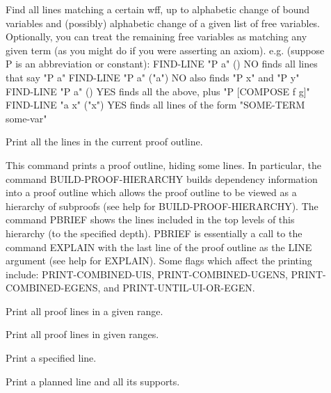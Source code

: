 \begin{description}
\item[\parbox{\textwidth}{FIND-LINE \textit{wff} \textit{vars} \textit{meta}}]  
Find all lines matching a certain wff, up to
alphabetic change of bound variables and (possibly) 
alphabetic change of a given list of free variables.
Optionally, you can treat the remaining free variables
as matching any given term (as you might do if you were
asserting an axiom).
e.g. (suppose P is an abbreviation or constant):
FIND-LINE "P a" () NO       finds all lines that say "P a"
FIND-LINE "P a" ("a") NO    also finds "P x" and "P y"
FIND-LINE "P a" () YES      finds all the above, plus 
                              "P [COMPOSE f g]"
FIND-LINE "a x" ("x") YES   finds all lines of the form
                              "SOME-TERM some-var"

\item[\parbox{\textwidth}{PALL}]  
	Print all the lines in the current proof outline.

\item[\parbox{\textwidth}{PBRIEF \textit{depth}}]  
This command prints a proof outline, hiding some lines.
In particular, the command BUILD-PROOF-HIERARCHY builds
dependency information into a proof outline which allows
the proof outline to be viewed as a hierarchy of subproofs (see
help for BUILD-PROOF-HIERARCHY).  The command PBRIEF shows
the lines included in the top levels of this hierarchy (to the 
specified depth). PBRIEF is essentially a call to the command EXPLAIN
with the last line of the proof outline as the LINE argument (see help 
for EXPLAIN).  Some flags which affect the printing include:
PRINT-COMBINED-UIS, PRINT-COMBINED-UGENS, PRINT-COMBINED-EGENS,
and PRINT-UNTIL-UI-OR-EGEN.

\item[\parbox{\textwidth}{PL \textit{num1} \textit{num2}}]  
	Print all proof lines in a given range.

\item[\parbox{\textwidth}{PL* \textit{print-ranges}}]  
Print all proof lines in given ranges.

\item[\parbox{\textwidth}{PLINE \textit{line}}]  
	Print a specified line.

\item[\parbox{\textwidth}{PPLAN \textit{pline}}]  
	Print a planned line and all its supports.


\end{description}
